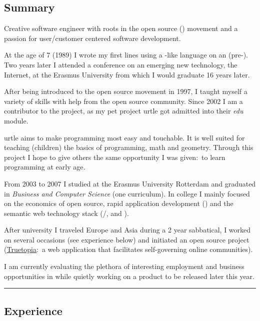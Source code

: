 \documentclass[10pt,a4paper]{article}
\begin{document}
\subsection*{Summary}
\vspace{-1.2em}
\begin{multicols}{2}
Creative software engineer with roots in the open source () movement and a passion for user/customer centered software development.

At the age of 7 (1989) I wrote my first lines using a -like language on an  (pre-). Two years later I attended a conference on an emerging new technology, the Internet, at the Erasmus University from which I would graduate 16 years later.

After being introduced to the open source movement in 1997, I taught myself a variety of skills with help from the open source community. Since 2002 I am a contributor to the  project, as my pet project urtle got admitted into their \emph{edu} module.

urtle aims to make programming most easy and touchable. It is well suited for teaching (children) the basics of programming, math and geometry. Through this project I hope to give others the same opportunity I was given:\ to learn programming at early age.

From 2003 to 2007 I studied at the Erasmus University Rotterdam and graduated in \emph{Business and Computer Science} (one curriculum). In college I mainly focused on the economics of open source, rapid application development () and the semantic web technology stack (/,  and ).

After university I traveled Europe and Asia during a 2 year sabbatical, I worked on several occasions (see experience below) and initiated an open source project (\href{http://www.truetopiaproject.org}{Truetopia}:\ a web application that facilitates self-governing online communities).

I am currently evaluating the plethora of interesting employment and business opportunities in  while quietly working on a product to be released later this year.
\end{multicols}
\hrule
\vspace{-0.4em}
\subsection*{Experience}
\end{document}
